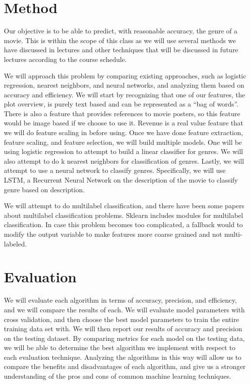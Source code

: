 \documentclass[sigconf]{acmart}
\begin{document}
\section{Method}

Our objective is to be able to predict, with reasonable accuracy, the genre of a movie. This is within the scope of this class as we will use several methods we have discussed in lectures and other techniques that will be discussed in future lectures according to the course schedule.\linebreak

We will approach this problem by comparing existing approaches, such as logistic regression, nearest neighbors, and neural networks, and analyzing them based on accuracy and efficiency.  We will start by recognizing that one of our features, the plot overview, is purely text based and can be represented as a ``bag of words''. There is also a feature that provides references to movie posters, so this feature would be image based if we choose to use it. Revenue is a real value feature that we will do feature scaling in before using. Once we have done feature extraction, feature scaling, and feature selection, we will build multiple models.  One will be using logistic regression to attempt to build a linear classifier for genres. We will also attempt to do k nearest neighbors for classification of genres.  Lastly, we will attempt to use a neural network to classify genres. Specifically, we will use LSTM, a Recurrent Neural Network on the description of the movie to classify genre based on description. \linebreak

We will attempt to do multilabel classification, and there have been some papers about multilabel classification problems.  Sklearn includes modules for multilabel classification. In case this problem becomes too complicated, a fallback would to modify the output variable to make features more coarse grained and not multi-labeled. 


\section{Evaluation}

We will evaluate each algorithm in terms of accuracy, precision, and efficiency, and we will compare the results of each.  We will evaluate model parameters with cross validation, and then choose the best model parameters to train the entire training data set with.  We will then report our results of accuracy and precision on the testing dataset. By comparing metrics for each model on the testing data, we will be able to determine the best algorithm we implement with respect to each evaluation technique. Analyzing the algorithms in this way will allow us to compare the benefits and disadvantages of each algorithm, and  give us a stronger understanding of the pros and cons of common machine learning techniques. 
\end{document}
